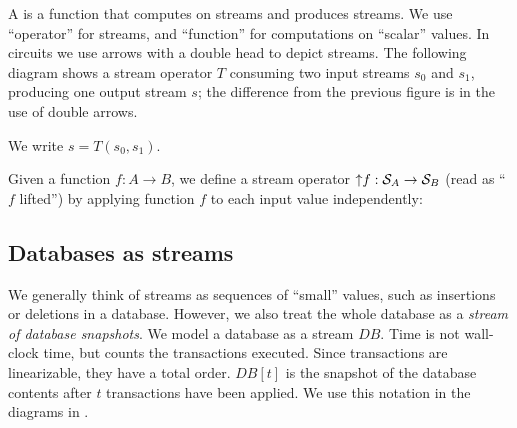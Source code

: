 A  is a function that computes on streams and
produces streams.  We use ``operator'' for streams, and ``function''
for computations on ``scalar'' values.  In circuits we use arrows with
a double head to depict streams.  The following diagram shows a stream
operator $T$ consuming two input streams $s_0$ and $s_1$, producing
one output stream $s$; the difference from the previous figure is in
the use of double arrows.
%
\begin{center}
\end{center}
%
We write $s = T(s_0, s_1)$.

Given a function $f: A \to B$, we define a stream operator ${\uparrow}f
:\mathcal{S}_{A} \to \mathcal{S}_{B}$ (read as ``$f$ lifted'') by applying
function $f$ to each input value independently:

\noindent
\begin{center}
\end{center}

\vspace{-3ex}

\subsection{Databases as streams}

We generally think of streams as sequences of ``small'' values, such
as insertions or deletions in a database.  However, we also treat the
whole database as a \emph{stream of database snapshots}.  We model a
database as a stream $DB$.  Time is not wall-clock time, but counts
the transactions executed.  Since transactions are linearizable, they
have a total order.  $DB[t]$ is the snapshot of the database contents
after $t$ transactions have been applied.  We use this notation in the
diagrams in .

